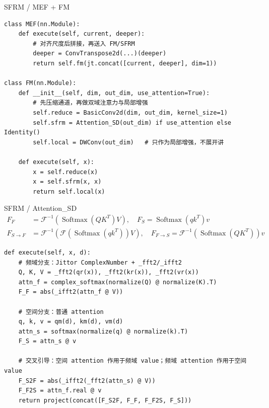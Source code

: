 \begin{frame}[fragile]{SFRM / MEF + FM}
\begin{lstlisting}[style=pythoncode,basicstyle=\ttfamily\tiny]
class MEF(nn.Module):
    def execute(self, current, deeper):
        # 对齐尺度后拼接，再送入 FM/SFRM
        deeper = ConvTranspose2d(...)(deeper)
        return self.fm(jt.concat([current, deeper], dim=1))

class FM(nn.Module):
    def __init__(self, dim, out_dim, use_attention=True):
        # 先压缩通道，再做双域注意力与局部增强
        self.reduce = BasicConv2d(dim, out_dim, kernel_size=1)
        self.sfrm = Attention_SD(out_dim) if use_attention else Identity()
        self.local = DWConv(out_dim)   # 只作为局部增强，不展开讲

    def execute(self, x):
        x = self.reduce(x)
        x = self.sfrm(x, x)
        return self.local(x)
\end{lstlisting}
\end{frame}

\begin{frame}[fragile]{SFRM / Attention\_SD}
\[
\begin{aligned}
F_F &= \mathcal{F}^{-1}(\operatorname{Softmax}(QK^T)V),\quad
F_S = \operatorname{Softmax}(qk^T)v \\
F_{S\to F} &= \mathcal{F}^{-1}(\mathcal{F}(\operatorname{Softmax}(qk^T))V),\quad
F_{F\to S}=\mathcal{F}^{-1}(\operatorname{Softmax}(QK^T))v
\end{aligned}
\]
\begin{lstlisting}[style=pythoncode,basicstyle=\ttfamily\tiny]
def execute(self, x, d):
    # 频域分支：Jittor ComplexNumber + _fft2/_ifft2
    Q, K, V = _fft2(qr(x)), _fft2(kr(x)), _fft2(vr(x))
    attn_f = complex_softmax(normalize(Q) @ normalize(K).T)
    F_F = abs(_ifft2(attn_f @ V))

    # 空间分支：普通 attention
    q, k, v = qm(d), km(d), vm(d)
    attn_s = softmax(normalize(q) @ normalize(k).T)
    F_S = attn_s @ v

    # 交叉引导：空间 attention 作用于频域 value；频域 attention 作用于空间 value
    F_S2F = abs(_ifft2(_fft2(attn_s) @ V))
    F_F2S = attn_f.real @ v
    return project(concat([F_S2F, F_F, F_F2S, F_S]))
\end{lstlisting}
\end{frame}

